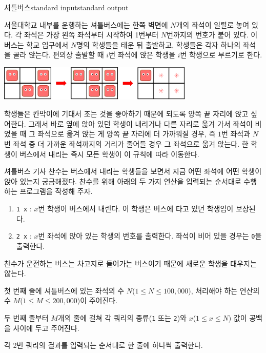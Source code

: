 \begin{problem}{셔틀버스}{standard input}{standard output}

서울대학교 내부를 운행하는 셔틀버스에는 한쪽 벽면에 $N$개의 좌석이 일렬로 놓여 있다. 각 좌석은 가장 왼쪽 좌석부터 시작하여 1번부터 $N$번까지의 번호가 붙어 있다. 이 버스는 학교 입구에서 $N$명의 학생들을 태운 뒤 출발하고, 학생들은 각자 하나의 좌석을 골라 앉는다. 편의상 출발할 때 $i$번 좌석에 앉은 학생을 $i$번 학생으로 부르기로 한다.

\begin{center}
  \includegraphics[width=0.7\textwidth]{nemo.png}
\end{center}

학생들은 칸막이에 기대서 조는 것을 좋아하기 때문에 되도록 양쪽 끝 자리에 앉고 싶어한다. 그래서 바로 옆에 앉아 있던 학생이 내리거나 다른 자리로 옮겨 가서 좌석이 비었을 때 그 좌석으로 옮겨 앉는 게 양쪽 끝 자리에 더 가까워질 경우, 즉 $1$번 좌석과 $N$번 좌석 중 더 가까운 좌석까지의 거리가 줄어들 경우 그 좌석으로 옮겨 앉는다. 한 학생이 버스에서 내리는 즉시 모든 학생이 이 규칙에 따라 이동한다.

셔틀버스 기사 찬수는 버스에서 내리는 학생들을 보면서 지금 어떤 좌석에 어떤 학생이 앉아 있는지 궁금해졌다. 찬수를 위해 아래의 두 가지 연산을 입력되는 순서대로 수행하는 프로그램을 작성해 주자.

\begin{enumerate}
\item{\texttt{1 x} : $x$번 학생이 버스에서 내린다. 이 학생은 버스에 타고 있던 학생임이 보장된다.}
\item{\texttt{2 x} : $x$번 좌석에 앉아 있는 학생의 번호를 출력한다. 좌석이 비어 있을 경우는 \texttt{0}을 출력한다.}
\end{enumerate}

찬수가 운전하는 버스는 차고지로 들어가는 버스이기 때문에 새로운 학생을 태우지는 않는다.

\InputFile
첫 번째 줄에 셔틀버스에 있는 좌석의 수 $N$($1 \le N \le 100,000$), 처리해야 하는 연산의 수 $M$($1 \le M \le 200,000$)이 주어진다.

두 번째 줄부터 $M$개의 줄에 걸쳐 각 쿼리의 종류(\texttt{1} 또는 \texttt{2})와 $x$($1 \le x \le N$) 값이 공백을 사이에 두고 주어진다.

\OutputFile
각 2번 쿼리의 결과를 입력되는 순서대로 한 줄에 하나씩 출력한다.


\end{problem}
